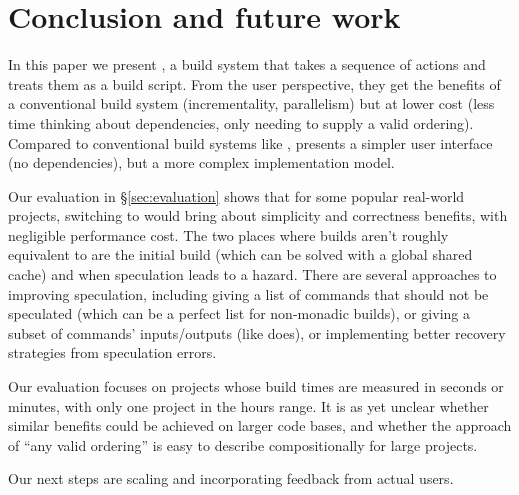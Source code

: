 \section{Conclusion and future work}
\label{sec:conclusion}

In this paper we present \Rattle, a build system that  takes a sequence of actions and treats them as a build script. From the user perspective, they get the benefits of a conventional build system (incrementality, parallelism) but at lower cost (less time thinking about dependencies, only needing to supply a valid ordering). Compared to conventional build systems like \Make,  \Rattle presents a simpler user interface (no dependencies), but a more complex implementation model.

Our evaluation in \S\ref{sec:evaluation} shows that for some popular real-world projects, switching to \Rattle would bring about simplicity and correctness benefits, with negligible performance cost. The two places where builds aren't roughly equivalent to \Make are the initial build (which can be solved with a global shared cache) and when speculation leads to a hazard. There are several approaches to improving speculation, including giving \Rattle a list of commands that should not be speculated (which can be a perfect list for non-monadic builds), or giving \Rattle a subset of commands' inputs/outputs (like \Fac does), or implementing better recovery strategies from speculation errors.

Our evaluation focuses on projects whose build times are measured in seconds or minutes, with only one project in the hours range. It is as yet unclear whether similar benefits could be achieved on larger code bases, and whether the \Rattle approach of ``any valid ordering'' is easy to describe compositionally for large projects.


Our next steps are scaling \Rattle and incorporating feedback from actual users.

